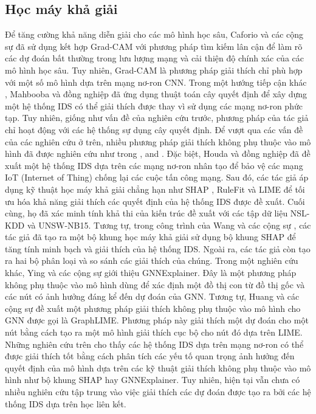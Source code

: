 \subsection{{Học máy khả giải}}
Để tăng cường khả năng diễn giải cho các mô hình học sâu, Caforio và các cộng sự \cite{caforio2021leveraging} đã sử dụng kết hợp Grad-CAM \cite{selvaraju2017grad} với phương pháp tìm kiếm lân cận để làm rõ các dự đoán bất thường trong lưu lượng mạng và cải thiện độ chính xác của các mô hình học sâu. Tuy nhiên, Grad-CAM là phương pháp giải thích chỉ phù hợp với một số mô hình dựa trên mạng nơ-ron CNN. Trong một hướng tiếp cận khác \cite{mahbooba2021explainable}, Mahbooba và đồng nghiệp đã ứng dụng thuật toán cây quyết định để xây dựng một hệ thống IDS có thể giải thích được thay vì sử dụng các mạng nơ-ron phức tạp. Tuy nhiên, giống như vấn đề của nghiên cứu trước, phương pháp của tác giả chỉ hoạt động với các hệ thống sự dụng cây quyết định.
\bigbreak\noindent
Để vượt qua các vấn đề của các nghiên cứu ở trên, nhiều phương pháp giải thích không phụ thuộc vào mô hình đã được nghiên cứu như trong \cite{9877919}, \cite{seale2022explainable} and \cite{ahmed2022artificial}. Đặc biệt, Houda và đồng nghiệp \cite{9825734} đã đề xuất một hệ thống IDS dựa trên các mạng nơ-ron nhân tạo để bảo vệ các mạng IoT (Internet of Thing) chống lại các cuộc tấn công mạng. Sau đó, các tác giả áp dụng kỹ thuật học máy khả giải chẳng hạn như SHAP \cite{lundberg2017unified}, RuleFit \cite{friedman2008predictive} và LIME \cite{ribeiro2016should} để tối ưu hóa khả năng giải thích các quyết định của hệ thống IDS được đề xuất. Cuối cùng, họ đã xác minh tính khả thi của kiến trúc đề xuất với các tập dữ liệu NSL-KDD và UNSW-NB15. Tương tự, trong công trình của Wang và các cộng sự \cite{wang2020explainable}, các tác giả đã tạo ra một bộ khung học máy khả giải sử dụng bộ khung SHAP để tăng tính minh bạch và giải thích của hệ thống IDS. Ngoài ra, các tác giả còn tạo ra hai bộ phân loại và so sánh các giải thích của chúng.
\bigbreak\noindent
Trong một nghiên cứu khác, Ying và các cộng sự \cite{ying2019gnnexplainer} giới thiệu GNNExplainer. Đây là một phương pháp không phụ thuộc vào mô hình dùng để xác định một đồ thị con từ đồ thị gốc và các nút có ảnh hưởng đáng kể đến dự đoán của GNN. Tương tự, Huang và các cộng sự \cite{huang2020graphlime} đề xuất một phương pháp giải thích không phụ thuộc vào mô hình cho GNN được gọi là GraphLIME. Phương pháp này giải thích một dự đoán cho một nút bằng cách tạo ra một mô hình giải thích cục bộ cho nút đó dựa trên LIME. Những nghiên cứu trên cho thấy các hệ thống IDS dựa trên mạng nơ-ron có thể được giải thích tốt bằng cách phân tích các yếu tố quan trọng ảnh hưởng đến quyết định của mô hình dựa trên các kỹ thuật giải thích không phụ thuộc vào mô hình như bộ khung SHAP hay GNNExplainer. Tuy nhiên, hiện tại vẫn chưa có nhiều nghiên cứu tập trung vào việc giải thích các dự đoán được tạo ra bởi các hệ thống IDS dựa trên học liên kết.


